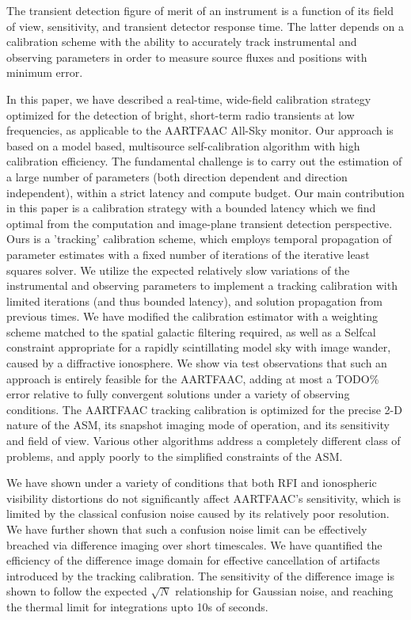 \documentclass{aa}
\begin{document}
The transient detection figure of merit of an instrument is a function
of its field of view, sensitivity, and transient detector response
time. The latter depends on a calibration scheme with the ability
to accurately track instrumental and observing parameters in order
to measure source fluxes and positions with minimum error. 

In this paper, we have described a real-time, wide-field calibration
strategy optimized for the detection of bright, short-term radio transients
at low frequencies, as applicable to the AARTFAAC All-Sky monitor.
Our approach is based on a model based, multisource self-calibration
algorithm with high calibration efficiency. The fundamental challenge
is to carry out the estimation of a large number of parameters (both
direction dependent and direction independent), within a strict latency
and compute budget. Our main contribution in this paper is a calibration
strategy with a bounded latency which we find optimal from the computation
and image-plane transient detection perspective. Ours is a 'tracking'
calibration scheme, which employs temporal propagation of parameter
estimates with a fixed number of iterations of the iterative least
squares solver. We utilize the expected relatively slow variations
of the instrumental and observing parameters to implement a tracking
calibration with limited iterations (and thus bounded latency), and
solution propagation from previous times. We have modified the calibration
estimator with a weighting scheme matched to the spatial galactic
filtering required, as well as a Selfcal constraint appropriate for
a rapidly scintillating model sky with image wander, caused by a diffractive
ionosphere. We show via test observations that such an approach is
entirely feasible for the AARTFAAC, adding at most a TODO\% error
relative to fully convergent solutions under a variety of observing
conditions. The AARTFAAC tracking calibration is optimized for the
precise 2-D nature of the ASM, its snapshot imaging mode of operation,
and its sensitivity and field of view. Various other algorithms address
a completely different class of problems, and apply poorly to the
simplified constraints of the ASM.

We have shown under a variety of conditions that both RFI and ionospheric
visibility distortions do not significantly affect AARTFAAC's sensitivity,
which is limited by the classical confusion noise caused by its relatively
poor resolution. We have further shown that such a confusion noise
limit can be effectively breached via difference imaging over short
timescales. We have quantified the efficiency of the difference image
domain for effective cancellation of artifacts introduced by the tracking
calibration. The sensitivity of the difference image is shown to follow
the expected $\sqrt{N}$ relationship for Gaussian noise, and reaching
the thermal limit for integrations upto 10s of seconds. 
\end{document}
